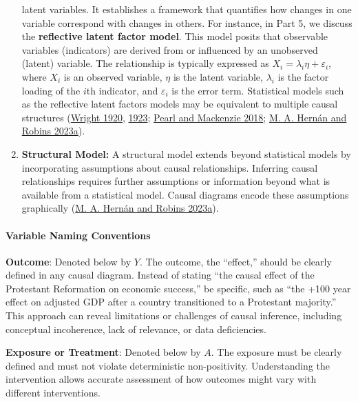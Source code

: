 \documentclass[
  singlecolumn]{article}
\let\oldparagraph\paragraph
\renewcommand{\paragraph}[1]{\oldparagraph{#1}\mbox{}}
\begin{document}
\begin{enumerate}
  latent variables. It establishes a framework that quantifies how
  changes in one variable correspond with changes in others. For
  instance, in Part 5, we discuss the \textbf{reflective latent factor
  model}. This model posits that observable variables (indicators) are
  derived from or influenced by an unobserved (latent) variable. The
  relationship is typically expressed as
  \(X_i = \lambda_i \eta + \varepsilon_i\), where \(X_i\) is an observed
  variable, \(\eta\) is the latent variable, \(\lambda_i\) is the factor
  loading of the \(i\)th indicator, and \(\varepsilon_i\) is the error
  term. Statistical models such as the reflective latent factors models
  may be equivalent to multiple causal structures
  (\protect\hyperlink{ref-wright1920}{Wright 1920},
  \protect\hyperlink{ref-wright1923}{1923};
  \protect\hyperlink{ref-pearl2018}{Pearl and Mackenzie 2018};
  \protect\hyperlink{ref-hernuxe1n2023}{M. A. Hernán and Robins 2023a}).
\item
  \textbf{Structural Model:} A structural model extends beyond
  statistical models by incorporating assumptions about causal
  relationships. Inferring causal relationships requires further
  assumptions or information beyond what is available from a statistical
  model. Causal diagrams encode these assumptions graphically
  (\protect\hyperlink{ref-hernuxe1n2023}{M. A. Hernán and Robins
  2023a}).
\end{enumerate}

\hypertarget{variable-naming-conventions}{%
\paragraph{Variable Naming
Conventions}\label{variable-naming-conventions}}

\textbf{Outcome}: Denoted below by \(Y\). The outcome, the ``effect,''
should be clearly defined in any causal diagram. Instead of stating
``the causal effect of the Protestant Reformation on economic success,''
be specific, such as ``the +100 year effect on adjusted GDP after a
country transitioned to a Protestant majority.'' This approach can
reveal limitations or challenges of causal inference, including
conceptual incoherence, lack of relevance, or data deficiencies.

\textbf{Exposure or Treatment}: Denoted below by \(A\). The exposure
must be clearly defined and must not violate deterministic
non-positivity. Understanding the intervention allows accurate
assessment of how outcomes might vary with different interventions.
\end{document}
